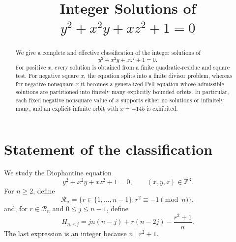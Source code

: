 \documentclass[a4paper,11pt]{amsart}
\title[Integer Solutions of a Ternary Equation]
{Integer Solutions of \texorpdfstring{$y^2+x^2y+xz^2+1=0$}{y2+x2y+xz2+1=0}}
\author{}
\date{}
\theoremstyle{definition}
\theoremstyle{remark}
\newcommand{\Z}{\mathbb Z}
\begin{document}
\begin{abstract}
We give a complete and effective classification of the integer solutions of
\[
y^2+x^2y+xz^2+1=0.
\]
For positive $x$, every solution is obtained from a finite quadratic-residue and square test.  For negative square $x$, the equation splits into a finite divisor problem, whereas for negative nonsquare $x$ it becomes a generalized Pell equation whose admissible solutions are partitioned into finitely many explicitly bounded orbits.  In particular, each fixed negative nonsquare value of $x$ supports either no solutions or infinitely many, and an explicit infinite orbit with $x=-145$ is exhibited.
\end{abstract}

\maketitle

\section{Statement of the classification}

We study the Diophantine equation
\begin{equation}\label{eq:original}
y^2+x^2y+xz^2+1=0,
\qquad (x,y,z)\in\Z^3.
\end{equation}
For $n\ge 2$, define
\begin{equation}\label{eq:Rn}
\mathcal R_n
 =\{r\in\{1,\dots,n-1\}:r^2\equiv-1\pmod n\},
\end{equation}
and, for $r\in\mathcal R_n$ and $0\le j\le n-1$, define
\begin{equation}\label{eq:Hnrj}
H_{n,r,j}
 =jn(n-j)+r(n-2j)-\frac{r^2+1}{n}.
\end{equation}
The last expression is an integer because $n\mid r^2+1$.
\end{document}
